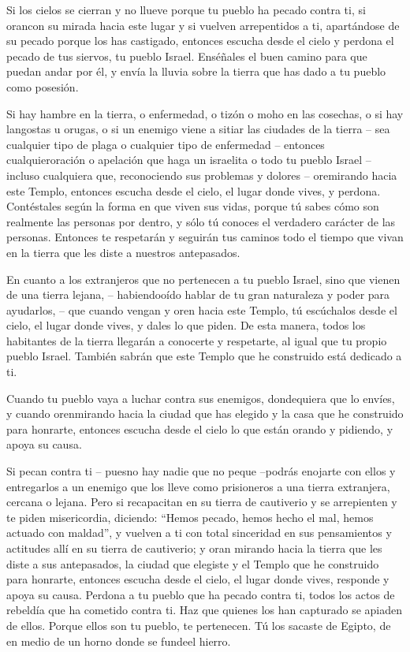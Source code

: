  Si los cielos se cierran y no llueve porque tu pueblo ha
pecado contra ti, si orancon su mirada hacia este lugar y si vuelven
arrepentidos a ti, apartándose de su pecado porque los has castigado,
 entonces escucha desde el cielo y perdona el pecado de tus
siervos, tu pueblo Israel. Enséñales el buen camino para que puedan
andar por él, y envía la lluvia sobre la tierra que has dado a tu pueblo
como posesión.

 Si hay hambre en la tierra, o enfermedad, o tizón o moho
en las cosechas, o si hay langostas u orugas, o si un enemigo viene a
sitiar las ciudades de la tierra -- sea cualquier tipo de plaga o
cualquier tipo de enfermedad --  entonces cualquieroración
o apelación que haga un israelita o todo tu pueblo Israel -- incluso
cualquiera que, reconociendo sus problemas y dolores -- oremirando hacia
este Templo,  entonces escucha desde el cielo, el lugar
donde vives, y perdona. Contéstales según la forma en que viven sus
vidas, porque tú sabes cómo son realmente las personas por dentro, y
sólo tú conoces el verdadero carácter de las personas. 
Entonces te respetarán y seguirán tus caminos todo el tiempo que vivan
en la tierra que les diste a nuestros antepasados.

 En cuanto a los extranjeros que no pertenecen a tu pueblo
Israel, sino que vienen de una tierra lejana,  --
habiendooído hablar de tu gran naturaleza y poder para ayudarlos, -- que
cuando vengan y oren hacia este Templo,  tú escúchalos
desde el cielo, el lugar donde vives, y dales lo que piden. De esta
manera, todos los habitantes de la tierra llegarán a conocerte y
respetarte, al igual que tu propio pueblo Israel. También sabrán que
este Templo que he construido está dedicado a ti.

 Cuando tu pueblo vaya a luchar contra sus enemigos,
dondequiera que lo envíes, y cuando orenmirando hacia la ciudad que has
elegido y la casa que he construido para honrarte, 
entonces escucha desde el cielo lo que están orando y pidiendo, y apoya
su causa.

 Si pecan contra ti -- puesno hay nadie que no peque
--podrás enojarte con ellos y entregarlos a un enemigo que los lleve
como prisioneros a una tierra extranjera, cercana o lejana.
 Pero si recapacitan en su tierra de cautiverio y se
arrepienten y te piden misericordia, diciendo: ``Hemos pecado, hemos
hecho el mal, hemos actuado con maldad'',  y vuelven a ti
con total sinceridad en sus pensamientos y actitudes allí en su tierra
de cautiverio; y oran mirando hacia la tierra que les diste a sus
antepasados, la ciudad que elegiste y el Templo que he construido para
honrarte,  entonces escucha desde el cielo, el lugar donde
vives, responde y apoya su causa.  Perdona a tu pueblo que
ha pecado contra ti, todos los actos de rebeldía que ha cometido contra
ti. Haz que quienes los han capturado se apiaden de ellos. 
Porque ellos son tu pueblo, te pertenecen. Tú los sacaste de Egipto, de
en medio de un horno donde se fundeel hierro.

